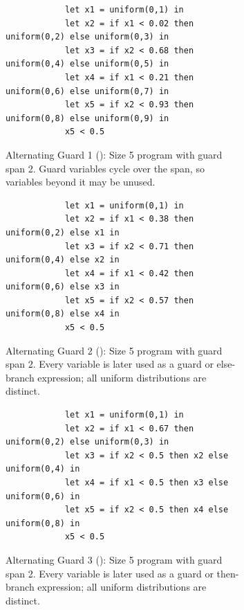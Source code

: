 \begin{figure}
    \centering
    \begin{subfigure}{\textwidth}
        \begin{lstlisting}
            let x1 = uniform(0,1) in
            let x2 = if x1 < 0.02 then uniform(0,2) else uniform(0,3) in
            let x3 = if x2 < 0.68 then uniform(0,4) else uniform(0,5) in
            let x4 = if x1 < 0.21 then uniform(0,6) else uniform(0,7) in
            let x5 = if x2 < 0.93 then uniform(0,8) else uniform(0,9) in
            x5 < 0.5
        \end{lstlisting}
        \caption{Alternating Guard 1 (): Size 5 program with guard span 2. Guard variables cycle over the span, so variables beyond it may be unused.}
        \label{fig:alt-benchmarks-a-example}
    \end{subfigure}
    \begin{subfigure}{\textwidth}
        \begin{lstlisting}
            let x1 = uniform(0,1) in
            let x2 = if x1 < 0.38 then uniform(0,2) else x1 in
            let x3 = if x2 < 0.71 then uniform(0,4) else x2 in
            let x4 = if x1 < 0.42 then uniform(0,6) else x3 in
            let x5 = if x2 < 0.57 then uniform(0,8) else x4 in
            x5 < 0.5
        \end{lstlisting}
        \caption{Alternating Guard 2 (): Size 5 program with guard span 2. Every variable is later used as a guard or else-branch expression; all uniform distributions are distinct.}
        \label{fig:alt-benchmarks-b-example}
    \end{subfigure}
    \begin{subfigure}{\textwidth}
        \begin{lstlisting}
            let x1 = uniform(0,1) in
            let x2 = if x1 < 0.67 then uniform(0,2) else uniform(0,3) in
            let x3 = if x2 < 0.5 then x2 else uniform(0,4) in
            let x4 = if x1 < 0.5 then x3 else uniform(0,6) in
            let x5 = if x2 < 0.5 then x4 else uniform(0,8) in
            x5 < 0.5
        \end{lstlisting}
        \caption{Alternating Guard 3 (): Size 5 program with guard span 2. Every variable is later used as a guard or then-branch expression; all uniform distributions are distinct.}
        \label{fig:alt-benchmarks-c-example}
    \end{subfigure}
    \begin{subfigure}{\textwidth}

\end{subfigure}
\end{figure}
